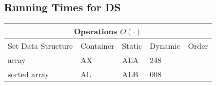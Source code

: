 \documentclass{article}
\begin{document}
    




\subsection{Running Times for DS}
\begin{center}
    

\begin{tabular}{ |p{3cm}||p{3cm}|p{3cm}|p{3cm}|p{3cm}|  }
    \hline
    \multicolumn{5}{|c|}{Operations $O(\cdot)$} \\
    \hline
    Set Data Structure& Container& Static& Dynamic& Order\\
    \hline
    array&   AX  & ALA   &248\\
    sorted array&AL & ALB&  008\\

    \hline
   \end{tabular}
\end{center}
\end{document}
